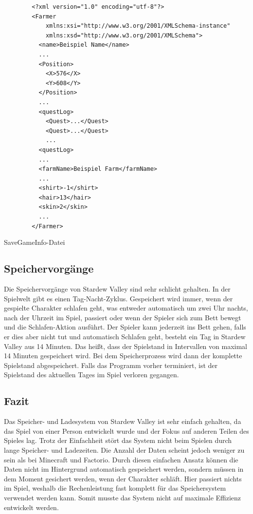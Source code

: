 \begin{listing}[htp]
    \begin{verbatim} 
        <?xml version="1.0" encoding="utf-8"?>
        <Farmer
            xmlns:xsi="http://www.w3.org/2001/XMLSchema-instance"
            xmlns:xsd="http://www.w3.org/2001/XMLSchema">
          <name>Beispiel Name</name>
          ...
          <Position>
            <X>576</X>
            <Y>608</Y>
          </Position>
          ...
          <questLog>
            <Quest>...</Quest>
            <Quest>...</Quest>
            ...
          <questLog>
          ...
          <farmName>Beispiel Farm</farmName>
          ...
          <shirt>-1</shirt>
          <hair>13</hair>
          <skin>2</skin>
          ...
        </Farmer>
    \end{verbatim}
    \caption{SaveGameInfo-Datei}
    \label{lst:stardewvalleySaveGameInfo}
\end{listing}

\subsection{Speichervorgänge}
Die Speichervorgänge von Stardew Valley sind sehr schlicht gehalten. In der Spielwelt gibt es einen Tag-Nacht-Zyklus. Gespeichert wird immer, wenn der gespielte Charakter schlafen geht, was entweder automatisch um zwei Uhr nachts, nach der Uhrzeit im Spiel, passiert oder wenn der Spieler sich zum Bett bewegt und die Schlafen-Aktion ausführt. Der Spieler kann jederzeit ins Bett gehen, falls er dies aber nicht tut und automatisch Schlafen geht, besteht ein Tag in Stardew Valley aus 14 Minuten.\cite{stardewvalleywikiCycle} Das heißt, dass der Spielstand in Intervallen von maximal 14 Minuten gespeichert wird. Bei dem Speicherprozess wird dann der komplette Spielstand abgespeichert. Falls das Programm vorher terminiert, ist der Spielstand des aktuellen Tages im Spiel verloren gegangen.\cite{stardewvalleywikiSaves}

\subsection{Fazit}
Das Speicher- und Ladesystem von Stardew Valley ist sehr einfach gehalten, da das Spiel von einer Person entwickelt wurde und der Fokus auf anderen Teilen des Spieles lag. Trotz der Einfachheit stört das System nicht beim Spielen durch lange Speicher- und Ladezeiten. Die Anzahl der Daten scheint jedoch weniger zu sein als bei Minecraft und Factorio. Durch diesen einfachen Ansatz können die Daten nicht im Hintergrund automatisch gespeichert werden, sondern müssen in dem Moment gesichert werden, wenn der Charakter schläft. Hier passiert nichts im Spiel, weshalb die Rechenleistung fast komplett für das Speichersystem verwendet werden kann. Somit musste das System nicht auf maximale Effizienz entwickelt werden.